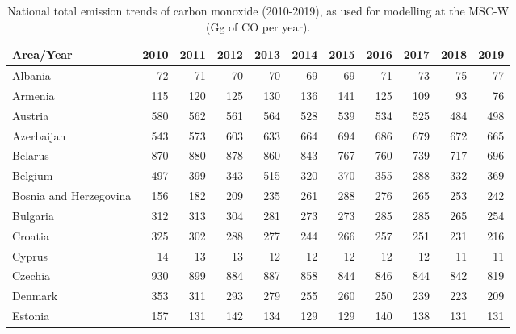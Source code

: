  \begin{table}
\caption{National total emission trends of carbon monoxide (2010-2019), as used for modelling at the MSC-W (Gg of CO per year).}
 
 \vspace{15pt}
 
 \scriptsize
 \centering
 \begin{tabular}{|l|r|r|r|r|r|r|r|r|r|r|}
 \hline
                     Area/Year&   2010&   2011&   2012&   2013&   2014&   2015&   2016&   2017&   2018&   2019\\\hline\hline
                       Albania&     72&     71&     70&     70&     69&     69&     71&     73&     75&     77\\\hline
                       Armenia&    115&    120&    125&    130&    136&    141&    125&    109&     93&     76\\\hline
                       Austria&    580&    562&    561&    564&    528&    539&    534&    525&    484&    498\\\hline
                    Azerbaijan&    543&    573&    603&    633&    664&    694&    686&    679&    672&    665\\\hline
                       Belarus&    870&    880&    878&    860&    843&    767&    760&    739&    717&    696\\\hline
                       Belgium&    497&    399&    343&    515&    320&    370&    355&    288&    332&    369\\\hline
        Bosnia and Herzegovina&    156&    182&    209&    235&    261&    288&    276&    265&    253&    242\\\hline
                      Bulgaria&    312&    313&    304&    281&    273&    273&    285&    285&    265&    254\\\hline
                       Croatia&    325&    302&    288&    277&    244&    266&    257&    251&    231&    216\\\hline
                        Cyprus&     14&     13&     13&     12&     12&     12&     12&     12&     11&     11\\\hline
                       Czechia&    930&    899&    884&    887&    858&    844&    846&    844&    842&    819\\\hline
                       Denmark&    353&    311&    293&    279&    255&    260&    250&    239&    223&    209\\\hline
                       Estonia&    157&    131&    142&    134&    129&    129&    140&    138&    131&    131\\\hline

\end{tabular}
\end{table}
